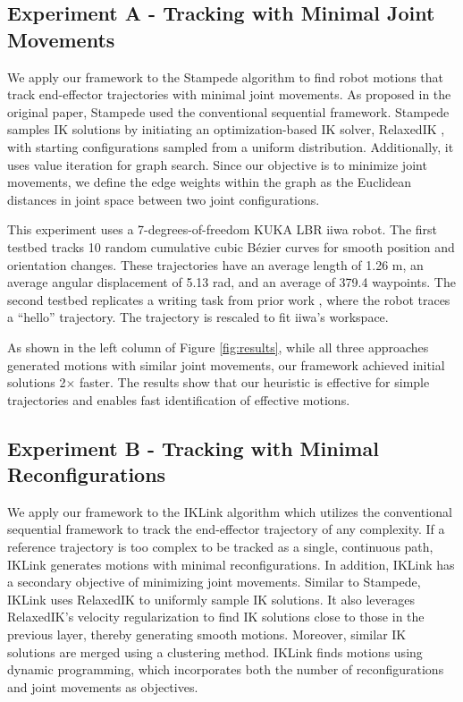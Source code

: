\vspace{-3mm}
\subsection{Experiment A - Tracking with Minimal Joint Movements} \label{sec: expA}
We apply our framework to the Stampede algorithm \cite{rakita2019stampede} to find robot motions that track end-effector trajectories with minimal joint movements. 
As proposed in the original paper, Stampede used the conventional sequential framework.
Stampede samples IK solutions by initiating an optimization-based IK solver, RelaxedIK \cite{rakita2018relaxedik}, with starting configurations sampled from a uniform distribution. 
Additionally, it uses value iteration for graph search. 
 Since our objective is to minimize joint movements, we define the edge weights within the graph as the Euclidean distances in joint space between two joint configurations. 

This experiment uses a 7-degrees-of-freedom KUKA LBR iiwa robot. The first testbed tracks 10 random cumulative cubic Bézier curves \cite{kim1995general} for smooth position and orientation changes. These trajectories have an average length of 1.26 m, an average angular displacement of 5.13 rad, and an average of 379.4 waypoints.
 The second testbed replicates a writing task from prior work \cite{morgan2024cppflow,kang2020torm}, where the robot traces a ``hello'' trajectory. The trajectory is rescaled to fit iiwa's workspace. 

As shown in the left column of Figure \ref{fig:results}, while all three approaches generated motions with similar joint movements, our framework achieved initial solutions 2$\times$ faster. The results show that our heuristic is effective for simple trajectories and enables fast identification of effective motions.


\vspace{-3mm}
\subsection{Experiment B - Tracking with Minimal Reconfigurations} \label{sec: expB}

We apply our framework to the IKLink algorithm \cite{wang2024iklink} which utilizes the conventional sequential framework to track the end-effector trajectory of any complexity.  If a reference trajectory is too complex to be tracked as a single, continuous path, IKLink generates motions with minimal reconfigurations. In addition, IKLink has a secondary objective of minimizing joint movements. Similar to Stampede, IKLink uses RelaxedIK \cite{rakita2018relaxedik} to uniformly sample IK solutions. It also leverages RelaxedIK's velocity regularization to find IK solutions close to those in the previous layer, thereby generating smooth motions. Moreover, similar IK solutions are merged using a clustering method. IKLink finds motions using dynamic programming, which incorporates both the number of reconfigurations and joint movements as objectives. 

